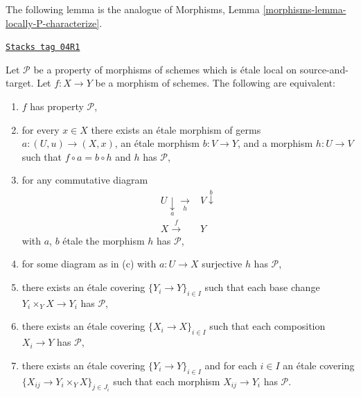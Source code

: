 The following lemma is the analogue of
Morphisms, Lemma \ref{morphisms-lemma-locally-P-characterize}.

\begin{lemma}
\label{descent-lemma-local-source-target-characterize}
\href{https://stacks.math.columbia.edu/tag/04R1}{\texttt{Stacks tag 04R1}}

Let $\mathcal{P}$ be a property of morphisms of schemes which is
\'etale local on source-and-target. Let $f : X \to Y$ be a morphism
of schemes. The following are equivalent:
\begin{enumerate}
\item[(a)] $f$ has property $\mathcal{P}$,
\item[(b)] for every $x \in X$ there exists an \'etale morphism of germs
$a : (U, u) \to (X, x)$, an \'etale morphism $b : V \to Y$, and
a morphism $h : U \to V$ such that $f \circ a = b \circ h$ and
$h$ has $\mathcal{P}$,
\item[(c)]
for any commutative diagram
$$
\begin{array}{cc}U \underset{a}{\downarrow}\underset{h}{\longrightarrow} & V \overset{b}{\downarrow} \\ X \overset{f}{\longrightarrow} & Y\end{array}
$$
with $a$, $b$ \'etale the morphism $h$ has $\mathcal{P}$,
\item[(d)] for some diagram as in (c)
with $a : U \to X$ surjective $h$ has $\mathcal{P}$,
\item[(e)] there exists an \'etale covering $\{Y_i \to Y\}_{i \in I}$ such
that each base change $Y_i \times_Y X \to Y_i$ has $\mathcal{P}$,
\item[(f)] there exists an \'etale covering $\{X_i \to X\}_{i \in I}$ such
that each composition $X_i \to Y$ has $\mathcal{P}$,
\item[(g)] there exists an \'etale covering $\{Y_i \to Y\}_{i \in I}$ and
for each $i \in I$ an \'etale covering
$\{X_{ij} \to Y_i \times_Y X\}_{j \in J_i}$ such that each morphism
$X_{ij} \to Y_i$ has $\mathcal{P}$.
\end{enumerate}
\end{lemma}

